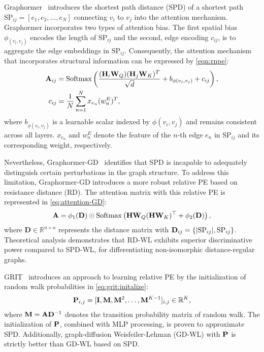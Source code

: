 Graphormer~\cite{Graphormer} introduces the shortest path distance (SPD) of a shortest path $\text{SP}_{ij}=[e_1,e_2,...,e_N]$ connecting $v_i$ to $v_j$ into the attention mechanism. Graphormer incorporates two types of attention bias. The first spatial bias $\phi_(v_i, v_j)$ encodes the length of $\text{SP}_{ij}$ and the second, edge encoding $c_{ij}$, is to aggregate the edge embeddings in $\text{SP}_{ij}$. Consequently, the attention mechanism that incorporates structural information can be expressed by \cref{eqn:rnpe}:
\begin{align}
\label{eqn:rnpe}
    \mathbf{A}_{ij}&=\text{Softmax}\left(\frac{(\mathbf{H}_i\mathbf{W}_{Q})(\mathbf{H}_j\mathbf{W}_{K})^T}{\sqrt{d}} + b_{\phi(v_i,v_j)} + c_{ij}\right),\\
    c_{ij} &=\frac{1}{N}\sum_{n=1}^{N} x_{e_n}(w^{E}_{n})^T, 
\end{align}
where $b_{\phi(v_i,v_j)}$ is a learnable scalar indexed by $\phi(v_i,v_j)$ and remains consistent across all layers.  $x_{e_n}$ and $w^{E}_{n}$ denote the feature of the $n$-th edge $e_n$ in $\text{SP}_{ij}$ and its corresponding weight, respectively. 

Nevertheless, Graphormer-GD~\cite{zhang2023rethinking} identifies that SPD is incapable to adequately distinguish certain perturbations in the graph structure. To address this limitation, Graphormer-GD introduces a more robust relative PE based on resistance distance (RD). %
The attention matrix with this relative PE is represented in \cref{eq:attention-GD}:
\begin{align}
\label{eq:attention-GD}
    \mathbf{A} = \phi_1(\mathbf D)\odot \operatorname{Softmax}\left(\mathbf{H} \mathbf{W}_Q(\mathbf{H} \mathbf{W}_K)^\top+\mathbf \phi_2(\mathbf D)\right),
\end{align}
where $\mathbf D\in\mathbb R^{n\times n}$ represents the distance matrix with $\mathbf{D}_{ij}=\{|\text{SP}_{ij}|, \text{SP}_{ij}\}$. 
Theoretical analysis demonstrates that RD-WL exhibits superior  discriminative power compared to SPD-WL, for differentiating non-isomorphic distance-regular graphs.

GRIT~\cite{ma2023graph} introduces an approach to learning relative PE by the initialization of random walk probabilities in \cref{eq:grit:initalize}:
\begin{align}
    \label{eq:grit:initalize}
    \mathbf{P}_{i,j} = [\mathbf{I}, \mathbf{M}, \mathbf{M}^2, \dots, \mathbf{M}^{K-1}]_{i,j} \in \mathbb{R}^K,
\end{align}
where $\mathbf{M} = \mathbf{A}\mathbf{D}^{-1}$ denotes the transition probability matrix of random walk. The initialization of $\mathbf{P}$, combined with MLP processing, is proven to approximate SPD. Additionally, graph-diffusion Weisfeiler-Lehman (GD-WL) with $\mathbf{P}$ is strictly better than GD-WL based on SPD.

